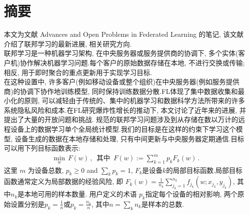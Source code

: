 
\section{摘要}


本文为文献 Advances and Open Problems in Federated Learning \citep{arxiv-Kairouz-Mcmahan-etc2019} 的笔记, 该文献介绍了联邦学习的最新进展, 相关研究方向.\\
联邦学习是一种机器学习架构, 在中央服务器或服务提供商的协调下, 多个实体(客户机)协作解决机器学习问题.每个客户的原始数据存储在本地, 不进行交换或传输;相反, 用于即时聚合的重点更新用于实现学习目标. \\
在这种设置中, 许多客户(例如移动设备或整个组织)在中央服务器(例如服务提供商)的协调下协作地训练模型, 同时保持训练数据分散.FL体现了集中数据收集和最小化的原则, 可以减轻由于传统的、集中的机器学习和数据科学方法所带来的许多系统隐私风险和成本.在FL研究爆炸性增长的推动下, 本文讨论了近年来的进展, 并提出了大量的开放问题和挑战. 
规范的联邦学习问题涉及到从存储在数以万计的远程设备上的数据学习单个全局统计模型.我们的目标是在这样的约束下学习这个模型, 设备生成的数据在本地存储和处理, 只有中间更新与中央服务器定期通信.目标可以用下列目标函数表示:
\begin{align*}
    \min_w \,  F(w) \,  ,  \, \, \,  \text{其中} \, \, \,  F(w) := \sum_{k=1}^m p_k F_k(w) \,  . \label{eq:original_obj}
\end{align*}
这里 $m$ 为设备总数,  $p_k \geq 0$ and $\sum_k p_k=1$,   $F_k$是设备$k$的局部目标函数.局部目标函数通常定义为局部数据的经验风险,  即 $F_k(w) = \frac{1}{n_k}\sum_{j_k=1}^{n_k} f_{j_k}(w; x_{j_k},  y_{j_k})$,  其中$n_k$是本地可用的样本数量. 用户定义的术语 $p_k$指定每个设备的相对影响, 两个原始设置分别是$p_k=\frac{1}{n}$或$p_k=\frac{n_k}{n}$, 其中$n=\sum_k n_k$是样本的总数.\citep{li2019federated}
 